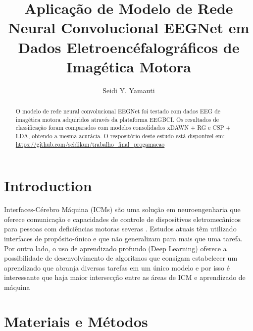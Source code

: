 \documentclass[conference,compsoc]{IEEEtran}
\begin{document}
%

\title{Aplicação de Modelo de Rede Neural Convolucional EEGNet em Dados Eletroencéfalográficos de Imagética Motora}


\author{Seidi Y. Yamauti\\
}

\maketitle

\begin{abstract}

O modelo de rede neural convolucional EEGNet foi testado com dados EEG de imagética motora adquiridos através da plataforma EEGBCI. Os resultados de classificação foram comparados com modelos consolidados xDAWN + RG e CSP + LDA, obtendo a mesma acurácia. O respositório deste estudo está disponível em: \url{https://github.com/seidikun/trabalho_final_progamacao}

\end{abstract}


\IEEEpeerreviewmaketitle


\section{Introduction}

Interfaces-Cérebro Máquina (ICMs) são uma solução em neuroengenharia que oferece comunicação e capacidades de controle de dispositivos eletromecânicos para pessoas com deficiências motoras severas \cite{nicolas2012brain}. Estudos atuais têm utilizado interfaces de propósito-único e que não generalizam para mais que uma tarefa. Por outro lado, o uso de aprendizado profundo (Deep Learning) oferece a possibilidade de desenvolvimento de algoritmos que consigam estabelecer um aprendizado que abranja diversas tarefas em um único modelo \cite{lecun2015deep} e por isso é interessante que haja maior intersecção entre as áreas de ICM e aprendizado de máquina


\section{Materiais e Métodos}
\end{document}
